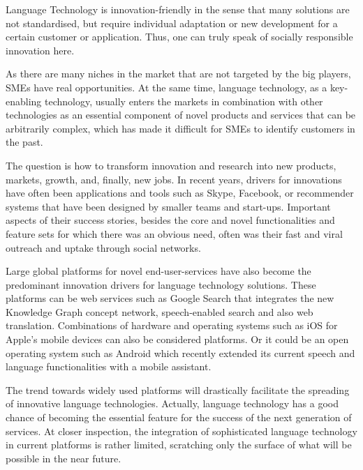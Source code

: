 \documentclass[10pt, plain]{../../metanetpaper}
\begin{document}
\begin{multicols}{2}

Language Technology is innovation-friendly in the sense that many solutions are not standardised, but require individual adaptation or new development for a certain customer or application. Thus, one can truly speak of socially responsible innovation here.

As there are many niches in the market that are not targeted by the big players, SMEs have real opportunities. At the same time, language technology, as a key-enabling technology, usually enters the markets in combination with other technologies as an essential component of novel products and services that can be arbitrarily complex, which has made it difficult for SMEs to identify customers in the past.

The question is how to transform innovation and research into new products, markets, growth, and, finally, new jobs. In recent years, drivers for innovations have often been applications and tools such as Skype, Facebook, or recommender systems that have been designed by smaller teams and start-ups. Important aspects of their success stories, besides the core and novel functionalities and feature sets for which there was an obvious need, often was their fast and viral outreach and uptake through social networks. 

Large global platforms for novel end-user-services have also become the predominant innovation drivers for language technology solutions. These platforms can be web services such as Google Search that integrates the new Knowledge Graph concept network, speech-enabled search \cite{meisel12} and also web translation. Combinations of hardware and operating systems such as iOS for Apple's mobile devices can also be considered platforms. Or it could be an open operating system such as Android which recently extended its current speech and language functionalities with a mobile assistant.

The trend towards widely used platforms will drastically facilitate the spreading of innovative language technologies. Actually, language technology has a good chance of becoming the essential feature for the success of the next generation of services. At closer inspection, the integration of sophisticated language technology in current platforms is rather limited, scratching only the surface of what will be possible in the near future.


\end{multicols}
\end{document}
